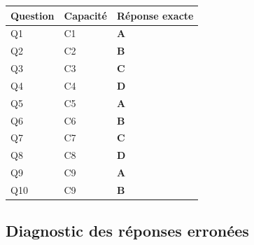 \begin{center}
\begin{tabular}{lll}
\hline
Question & Capacité & Réponse exacte \\
\hline
Q1 & C1 & \textbf{A} \\
Q2 & C2 & \textbf{B} \\
Q3 & C3 & \textbf{C} \\
Q4 & C4 & \textbf{D} \\
Q5 & C5 & \textbf{A} \\
Q6 & C6 & \textbf{B} \\
Q7 & C7 & \textbf{C} \\
Q8 & C8 & \textbf{D} \\
Q9 & C9 & \textbf{A} \\
Q10 & C9 & \textbf{B} \\
\hline
\end{tabular}
\end{center}

\subsection*{Diagnostic des réponses erronées}

